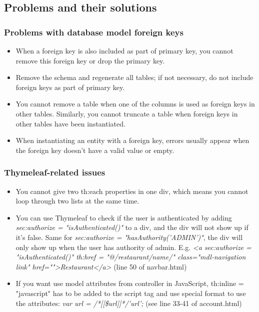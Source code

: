 \documentclass[12pt]{article}
\begin{document}
\subsection{Problems and their solutions}
\subsubsection{Problems with database model foreign keys}
\begin{itemize}
	\item When a foreign key is also included as part of primary key, you cannot remove this foreign key or drop the primary key.
	\item Remove the schema and regenerate all tables; if not necessary, do not include foreign keys as part of primary key.
	\item You cannot remove a table when one of the columns is used as foreign keys in other tables. Similarly, you cannot truncate a table when foreign keys in other tables have been instantiated.
	\item When instantiating an entity with a foreign key, errors usually appear when the foreign key doesn't have a valid value or empty.
\end{itemize}

\subsubsection{Thymeleaf-related issues}
\begin{itemize}
	\item You cannot give two th:each properties in one div, which means you cannot loop through two lists at the same time.
	\item You can use Thymeleaf to check if the user is authenticated by adding \textit{sec:authorize = "isAuthenticated()"} to a div, and the div will not show up if it’s false. Same for \textit{sec:authorize = "hasAuthority('ADMIN')"}, the div will only show up when the user has authority of admin. E.g. \textit{<a sec:authorize = "isAuthenticated()" th:href = "@{/restaurant/name/}" class="mdl-navigation  link" href="">Restaurant</a>} (line 50 of navbar.html)
	\item If you want use model attributes from controller in JavaScript, th:inline = "javascript" has to be added to the script tag and use special format to use the attributes: \textit{var url = /*[[\${url}]]*/'url';} (see line 33-41 of account.html)
\end{itemize}
\end{document}
